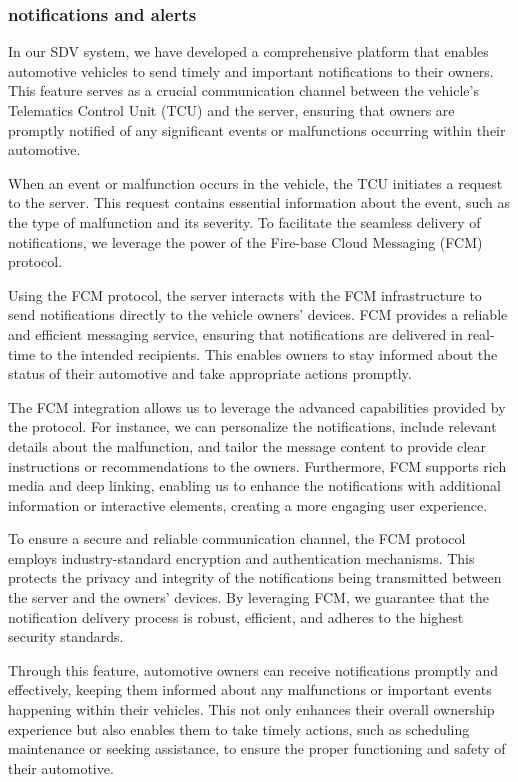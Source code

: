 \documentclass[
12pt,
oneside, 
onehalfspacing, 
nolistspacing, 
parskip, 
chapterinoneline, 
]{AASTCOMPUTER}
\begin{document}
\subsubsection{notifications and alerts}
In our SDV system, we have developed a comprehensive platform that enables automotive vehicles to send timely and important notifications to their owners. This feature serves as a crucial communication channel between the vehicle's Telematics Control Unit (TCU) and the server, ensuring that owners are promptly notified of any significant events or malfunctions occurring within their automotive.

When an event or malfunction occurs in the vehicle, the TCU initiates a request to the server. This request contains essential information about the event, such as the type of malfunction and its severity. To facilitate the seamless delivery of notifications, we leverage the power of the Fire-base Cloud Messaging (FCM) protocol.

Using the FCM protocol, the server interacts with the FCM infrastructure to send notifications directly to the vehicle owners' devices. FCM provides a reliable and efficient messaging service, ensuring that notifications are delivered in real-time to the intended recipients. This enables owners to stay informed about the status of their automotive and take appropriate actions promptly.

The FCM integration allows us to leverage the advanced capabilities provided by the protocol. For instance, we can personalize the notifications, include relevant details about the malfunction, and tailor the message content to provide clear instructions or recommendations to the owners. Furthermore, FCM supports rich media and deep linking, enabling us to enhance the notifications with additional information or interactive elements, creating a more engaging user experience.

To ensure a secure and reliable communication channel, the FCM protocol employs industry-standard encryption and authentication mechanisms. This protects the privacy and integrity of the notifications being transmitted between the server and the owners' devices. By leveraging FCM, we guarantee that the notification delivery process is robust, efficient, and adheres to the highest security standards.

Through this feature, automotive owners can receive notifications promptly and effectively, keeping them informed about any malfunctions or important events happening within their vehicles. This not only enhances their overall ownership experience but also enables them to take timely actions, such as scheduling maintenance or seeking assistance, to ensure the proper functioning and safety of their automotive.
\end{document}
